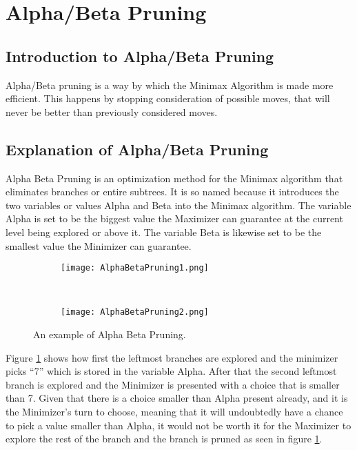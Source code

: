 \section{Alpha/Beta Pruning} 
\label{sec:Alpha/Beta Pruning}

\subsection{Introduction to Alpha/Beta Pruning}
\label{subsec:Introduction to Alpha/Beta Pruning}
Alpha/Beta pruning is a way by which the Minimax Algorithm is made more efficient.
This happens by stopping consideration of possible moves, that will never be better than previously considered moves.

\subsection{Explanation of Alpha/Beta Pruning}
\label{subsec:Explanation of Alpha/Beta Pruning}
Alpha Beta Pruning is an optimization method for the Minimax algorithm that eliminates branches or entire subtrees. 
It is so named because it introduces the two variables or values Alpha and Beta into the Minimax algorithm.
The variable Alpha is set to be the biggest value the Maximizer can guarantee at the current level being explored or above it. 
The variable Beta is likewise set to be the smallest value the Minimizer can guarantee.

\begin{figure}
    \centering %
    \begin{subfigure}[b]{0.3\textwidth}
        \texttt{[image: AlphaBetaPruning1.png]}           
    \end{subfigure}
    ~
    \begin{subfigure}[b]{0.3\textwidth}
        \texttt{[image: AlphaBetaPruning2.png]}       
    \end{subfigure}
    \caption{An example of Alpha Beta Pruning.} %
    \label{fig:AlphaBetaPruningA}
  \end{figure}

Figure \ref{fig:AlphaBetaPruningA} shows how first the leftmost branches are explored 
and the minimizer picks “7” which is stored in the variable Alpha. 
After that the second leftmost branch is explored and the Minimizer is presented with a choice that is smaller than 7.
Given that there is a choice smaller than Alpha present already, and it is the Minimizer’s turn to choose, 
meaning that it will undoubtedly have a chance to pick a value smaller than Alpha, 
it would not be worth it for the Maximizer to explore the rest of the branch and the branch is pruned as seen 
in figure \ref{fig:AlphaBetaPruningA}.

